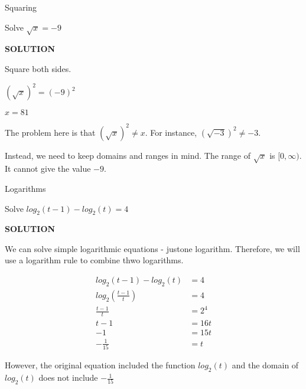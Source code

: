 \documentclass{ximera}
\begin{document}
\begin{example} Squaring


Solve $\sqrt{x} = -9$

\textbf{\textcolor{purple!50!blue!90!black}{SOLUTION}}

Square both sides.


$(\sqrt{x})^2 = (-9)^2$

$x = 81$



The problem here is that  $(\sqrt{x})^2 \ne x$.  For instance, $(\sqrt{-3})^2 \ne -3$.


Instead, we need to keep domains and ranges in mind.  The range of $\sqrt{x}$ is $[0, \infty)$. It cannot give the value $-9$.



\end{example}









\begin{example} Logarithms


Solve $log_2(t-1) - log_2(t) = 4$

\textbf{\textcolor{purple!50!blue!90!black}{SOLUTION}}


We can solve simple logarithmic equations - justone logarithm.  Therefore, we will use a logarithm rule to combine thwo logarithms.



\[
\begin{array}{rl}
log_2(t-1) - log_2(t) & = 4   \\

log_2\left(\frac{t-1}{t}\right)  & = 4  \\

\frac{t-1}{t} & = 2^4  \\

 t-1 & = 16t  \\

-1 & = 15t  \\

-\frac{1}{15} & = t

\end{array}
\]


However, the original equation included the function $log_2(t)$ and the domain of $log_2(t)$ does not include $-\frac{1}{15}$




\end{example}
\end{document}
